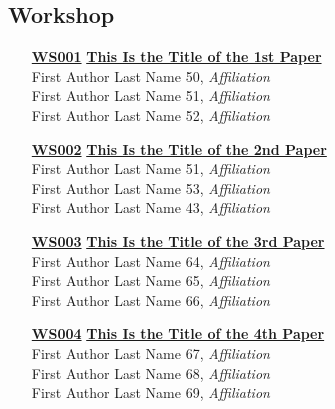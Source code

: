 \subsection{Workshop}
\begin{enumerate}
\item[\href{https://doi.org/10.1145/1122445.1122456}{\textbf{WS001}}]
\href{https://doi.org/10.1145/1122445.1122456}{\textbf{This Is the Title of the 1st Paper}}\\
First Author Last Name 50, \emph{Affiliation}\\
First Author Last Name 51, \emph{Affiliation}\\
First Author Last Name 52, \emph{Affiliation}\\

\item[\href{https://doi.org/10.1145/1122445.1122456}{\textbf{WS002}}]
\href{https://doi.org/10.1145/1122445.1122456}{\textbf{This Is the Title of the 2nd Paper}}\\
First Author Last Name 51, \emph{Affiliation}\\
First Author Last Name 53, \emph{Affiliation}\\
First Author Last Name 43, \emph{Affiliation}\\

\item[\href{https://doi.org/10.1145/1122445.1122456}{\textbf{WS003}}]
\href{https://doi.org/10.1145/1122445.1122456}{\textbf{This Is the Title of the 3rd Paper}}\\
First Author Last Name 64, \emph{Affiliation}\\
First Author Last Name 65, \emph{Affiliation}\\
First Author Last Name 66, \emph{Affiliation}\\

\item[\href{https://doi.org/10.1145/1122445.1122456}{\textbf{WS004}}]
\href{https://doi.org/10.1145/1122445.1122456}{\textbf{This Is the Title of the 4th Paper}}\\
First Author Last Name 67, \emph{Affiliation}\\
First Author Last Name 68, \emph{Affiliation}\\
First Author Last Name 69, \emph{Affiliation}\\
\end{enumerate}

